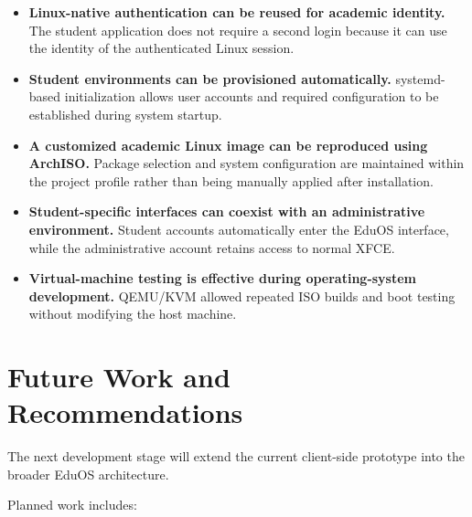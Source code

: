 \documentclass{tietreport}
\begin{document}
\begin{itemize}

    \item \textbf{Linux-native authentication can be reused for
    academic identity.}
    The student application does not require a second login because
    it can use the identity of the authenticated Linux session.

    \item \textbf{Student environments can be provisioned
    automatically.}
    systemd-based initialization allows user accounts and required
    configuration to be established during system startup.

    \item \textbf{A customized academic Linux image can be reproduced
    using ArchISO.}
    Package selection and system configuration are maintained within
    the project profile rather than being manually applied after
    installation.

    \item \textbf{Student-specific interfaces can coexist with an
    administrative environment.}
    Student accounts automatically enter the EduOS interface, while
    the administrative account retains access to normal XFCE.

    \item \textbf{Virtual-machine testing is effective during
    operating-system development.}
    QEMU/KVM allowed repeated ISO builds and boot testing without
    modifying the host machine.

\end{itemize}


\section{Future Work and Recommendations}

The next development stage will extend the current client-side
prototype into the broader EduOS architecture.

Planned work includes:
\end{document}
